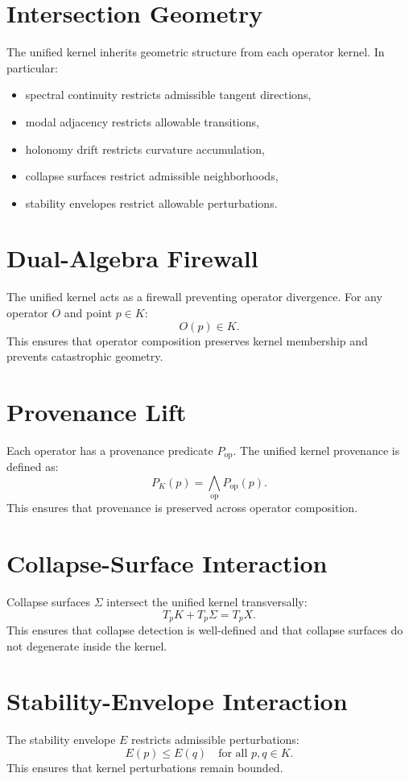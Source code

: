 \documentclass[11pt]{article}
\begin{document}
\section{Intersection Geometry}
The unified kernel inherits geometric structure from each operator kernel. In
particular:
\begin{itemize}
  \item spectral continuity restricts admissible tangent directions,
  \item modal adjacency restricts allowable transitions,
  \item holonomy drift restricts curvature accumulation,
  \item collapse surfaces restrict admissible neighborhoods,
  \item stability envelopes restrict allowable perturbations.
\end{itemize}

\section{Dual-Algebra Firewall}
The unified kernel acts as a firewall preventing operator divergence. For any
operator $O$ and point $p \in K$:
\[
O(p) \in K.
\]
This ensures that operator composition preserves kernel membership and prevents
catastrophic geometry.

\section{Provenance Lift}
Each operator has a provenance predicate $P_{\text{op}}$. The unified kernel
provenance is defined as:
\[
P_K(p) = \bigwedge_{\text{op}} P_{\text{op}}(p).
\]
This ensures that provenance is preserved across operator composition.

\section{Collapse-Surface Interaction}
Collapse surfaces $\Sigma$ intersect the unified kernel transversally:
\[
T_p K + T_p \Sigma = T_p X.
\]
This ensures that collapse detection is well-defined and that collapse surfaces
do not degenerate inside the kernel.

\section{Stability-Envelope Interaction}
The stability envelope $E$ restricts admissible perturbations:
\[
E(p) \leq E(q) \quad \text{for all } p, q \in K.
\]
This ensures that kernel perturbations remain bounded.
\end{document}
